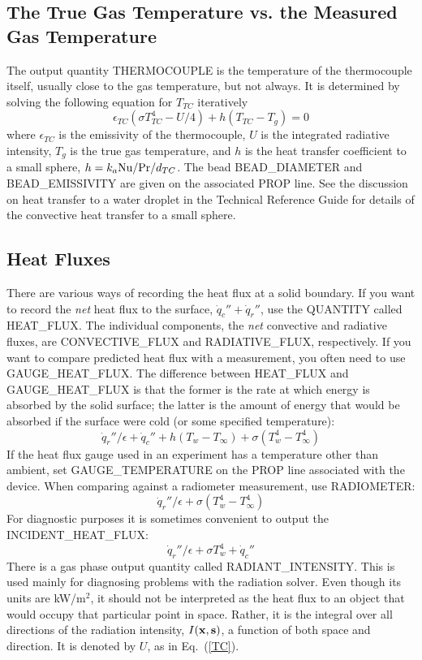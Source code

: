 \documentclass[11pt]{book}
\newcommand{\bx}{{\bf x}}
\newcommand{\bs}{{\bf s}}
\newcommand{\dq}{\dot{q}}
\newcommand{\be}{\begin{equation}}
\newcommand{\ee}{\end{equation}}
\newcommand{\PR}{\hbox{Pr}}
\newcommand{\NU}{\hbox{Nu}}
\begin{document}
\subsection{The True Gas Temperature vs. the Measured Gas Temperature}
\label{info:THERMOCOUPLE}

The output quantity {\ct THERMOCOUPLE} is the temperature
of the thermocouple itself, usually close to the gas temperature, but not
always. It is determined by solving the following equation
for $T_{TC}$ iteratively~\cite{Welsh:1}
\be \epsilon_{TC} (\sigma T_{TC}^4- U/4) + h(T_{TC}-T_g) = 0 \label{TC}  \ee
where $\epsilon_{TC}$ is the emissivity of the thermocouple, $U$ is the
integrated radiative intensity, $T_g$ is the true gas temperature, and
$h$ is the heat transfer coefficient to a small sphere,
$h=k_a \NU/\PR/d_{TC}$. The bead {\ct BEAD\_DIAMETER} and {\ct BEAD\_EMISSIVITY} are given on the associated {\ct PROP} line.
See the discussion on heat transfer to a water
droplet in the Technical Reference Guide for details of the convective
heat transfer to a small sphere.


\subsection{Heat Fluxes}
\label{info:heat_flux}

There are various ways of recording the heat flux at a solid boundary. If you want to record the {\em net} heat flux to
the surface, $\dq_c'' + \dq_r''$, use the {\ct QUANTITY} called {\ct HEAT\_FLUX}. The individual components, the {\em net}
convective and radiative fluxes, are {\ct CONVECTIVE\_FLUX} and {\ct RADIATIVE\_FLUX}, respectively. If you want to compare
predicted heat flux with a measurement, you often need to use {\ct GAUGE\_HEAT\_FLUX}.
The difference between {\ct HEAT\_FLUX} and {\ct GAUGE\_HEAT\_FLUX} is that
the former is the rate at which energy is absorbed by the solid surface;
the latter is the amount of energy that would be absorbed if the surface were cold (or some specified temperature):
$$\dq_r''/\epsilon +\dq_c'' + h(T_w-T_\infty) + \sigma (T_w^4-T_\infty^4)$$
If the heat flux gauge used in an experiment has
a temperature other than ambient, set {\ct GAUGE\_TEMPERATURE} on the {\ct PROP} line associated with the device.
When comparing against a radiometer measurement, use {\ct RADIOMETER}:
$$\dq_r''/\epsilon + \sigma (T_w^4-T_\infty^4) $$
For diagnostic purposes it is sometimes convenient to output the {\ct INCIDENT\_HEAT\_FLUX}:
$$ \dq_r''/\epsilon + \sigma T_w^4 +\dq_c'' $$
There is a gas phase output quantity called {\ct RADIANT\_INTENSITY}. This is used mainly for diagnosing problems with the
radiation solver. Even though its units are kW/m$^2$, it should not be interpreted as the heat flux to an object that would
occupy that particular point in space. Rather, it is the integral over all directions of the radiation intensity, $I(\bx,\bs)$, a function of both
space and direction. It is denoted by $U$, as in Eq.~(\ref{TC}).
\end{document}
